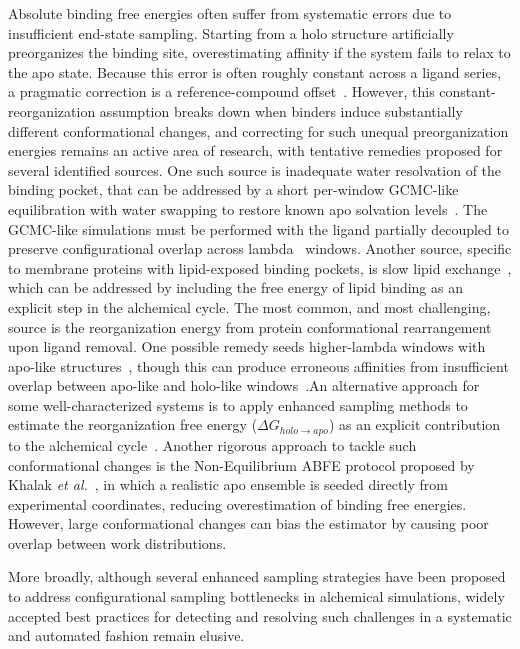 \documentclass[9pt,bestpractices]{livecoms}
\begin{document}
Absolute binding free energies often suffer from systematic errors due to insufficient end-state sampling. Starting from a holo structure artificially preorganizes the binding site, overestimating affinity if the system fails to relax to the apo state. Because this error is often roughly constant across a ligand series, a pragmatic correction is a reference-compound offset~\cite{SchrodingerVogele,Chen2023HitDiscovery,wu2025optimizing}. However, this constant-reorganization assumption breaks down when binders induce substantially different conformational changes, and correcting for such unequal preorganization energies remains an active area of research, with tentative remedies proposed for several identified sources. One such source is inadequate water resolvation of the binding pocket, that can be addressed by a short per-window GCMC-like equilibration with water swapping to restore known apo solvation levels~\cite{NithishABFE,BenShalom2020InterfacialWater}. The GCMC-like simulations must be performed with the ligand partially decoupled to preserve configurational overlap across lambda~\cite{ChenggongHuiGCMC} windows. Another source, specific to membrane proteins with lipid-exposed binding pockets, is slow lipid exchange~\cite{NithishABFE,CharlieCookABFE,lopezmartin2025lipidcode}, which can be addressed by including the free energy of lipid binding as an explicit step in the alchemical cycle. The most common, and most challenging, source is the reorganization energy from protein conformational rearrangement upon ligand removal. One possible remedy seeds higher-lambda windows with apo-like structures~\cite{SchrodingerApoWindow,CharlieCookABFE}, though this can produce erroneous affinities from insufficient overlap between apo-like and holo-like windows~\cite{NithishABFE}.An alternative approach for some well-characterized systems is to apply enhanced sampling methods to estimate the reorganization free energy ($\Delta G_{holo \rightarrow apo}$) as an explicit contribution to the alchemical cycle~\cite{NithishABFE,SchrodingerVogele}. Another rigorous approach to tackle such conformational changes is the Non-Equilibrium ABFE protocol proposed by Khalak \textit{et al.}~\cite{khalak2021alchemical}, in which a realistic apo ensemble is seeded directly from experimental coordinates, reducing overestimation of binding free energies. However, large conformational changes can bias the estimator by causing poor overlap between work distributions.

More broadly, although several enhanced sampling strategies have been proposed to address configurational sampling bottlenecks in alchemical simulations, widely accepted best practices for detecting and resolving such challenges in a systematic and automated fashion remain elusive. 
\end{document}
